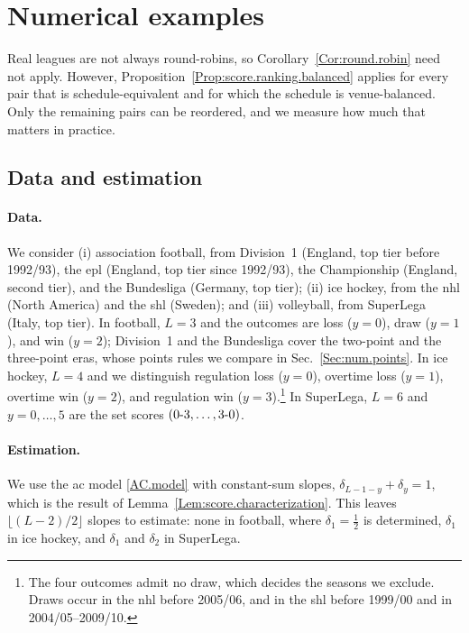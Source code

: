 \documentclass[letterpaper,12pt]{article}
\newcommand{\tnr}[1]{{\textnormal{#1}}}
\newcommand{\ld}{\ldots}
\begin{document}
\section{Numerical examples}\label{Sec:Numerical}

Real leagues are not always round-robins, so Corollary~\ref{Cor:round.robin} need not apply. However, Proposition~\ref{Prop:score.ranking.balanced} applies for every pair that is schedule-equivalent and for which the schedule is venue-balanced. Only the remaining pairs can be reordered, and we measure how much that matters in practice.

\subsection{Data and estimation}\label{Sec:num.estimation}

\paragraph{Data.}
We consider (i) association football, from Division~1 (England, top tier before 1992/93), the \gls{epl} (England, top tier since 1992/93), the Championship (England, second tier), and the Bundesliga (Germany, top tier); (ii) ice hockey, from the \gls{nhl} (North America) and the \gls{shl} (Sweden); and (iii) volleyball, from SuperLega (Italy, top tier). In football, $L=3$ and the outcomes are loss ($y=0$), draw ($y=1$), and win ($y=2$); Division~1 and the Bundesliga cover the two-point and the three-point eras, whose points rules we compare in Sec.~\ref{Sec:num.points}. In ice hockey, $L=4$ and we distinguish regulation loss ($y=0$), overtime loss ($y=1$), overtime win ($y=2$), and regulation win ($y=3$).\footnote{The four outcomes admit no draw, which decides the seasons we exclude. Draws occur in the \gls{nhl} before 2005/06, and in the \gls{shl} before 1999/00 and in 2004/05--2009/10.} In SuperLega, $L=6$ and $y=0,\ld,5$ are the set scores $(0\tnr{-}3,\ld,3\tnr{-}0)$.
\paragraph{Estimation.}
We use the \gls{ac} model \eqref{AC.model} with constant-sum slopes,
$\delta_{L-1-y}+\delta_y=1$, which is the result of Lemma~\ref{Lem:score.characterization}. This leaves $\lfloor (L-2)/2\rfloor$ slopes to estimate: none in football, where $\delta_1=\tfrac12$ is determined, $\delta_1$ in ice hockey, and $\delta_1$ and $\delta_2$ in SuperLega.
\end{document}
